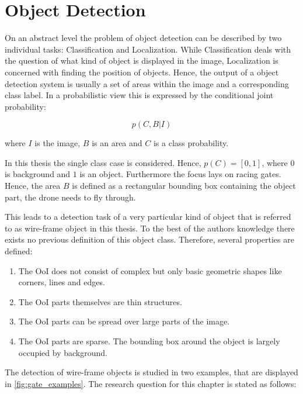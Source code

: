 	\chapter{Object Detection}
	\label{sec:object_detection}
	
	On an abstract level the problem of object detection can be described by two individual tasks: Classification and Localization. While Classification deals with the question of what kind of object is displayed in the image, Localization is concerned with finding the position of objects. Hence, the output of a object detection system is usually a set of areas within the image and a corresponding class label. In a probabilistic view this is expressed by the conditional joint probability:
	
	\begin{equation}
		p(C,B|I)
	\end{equation}
	
	where $I$ is the image, $B$ is an area and $C$ is a class probability.
	
	In this thesis the single class case is considered. Hence, $p(C) = [0,1]$, where $0$ is background and $1$ is an object. Furthermore the focus lays on racing gates. Hence, the area $B$ is defined as a rectangular bounding box containing the object part, the drone needs to fly through. 
	
	This leads to a detection task of a very particular kind of object that is referred to as wire-frame object in this thesis. To the best of the authors knowledge there exists no previous definition of this object class. Therefore, several properties are defined:
		
	\begin{enumerate}
		\item The \ac{OoI} does not consist of complex but only basic geometric shapes like corners, lines and edges.
		\item The \ac{OoI} parts themselves are thin structures.
		\item The \ac{OoI} parts can be spread over large parts of the image.
		\item The \ac{OoI} parts are sparse. The bounding box around the object is largely occupied by background.
	\end{enumerate}
	
	The detection of wire-frame objects is studied in two examples, that are displayed in \autoref{fig:gate_examples}. The research question for this chapter is stated as follows:
	
